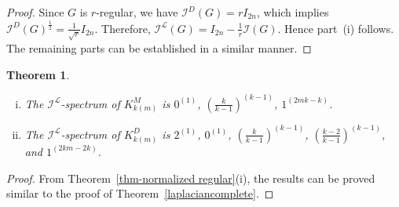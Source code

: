 \documentclass[12pt]{article}
\numberwithin{equation}{section}
\newtheorem{thm}{Theorem}[section]
\begin{document}
	\begin{proof}
		Since $G$ is $r$-regular, we have $\mathcal{I}^D(G)=rI_{2n}$, which implies $\mathcal{I}^D(G)^{\frac{1}{2}}=\displaystyle\frac{1}{\sqrt{r}}I_{2n}$. Therefore,  $\mathcal{I}^\mathcal{L}(G)=I_{2n}-\displaystyle\frac{1}{r}\mathcal{I}(G)$. Hence part~(i) follows. The remaining parts can be established in a similar manner.
	\end{proof}
	
	\begin{thm}\label{normalizedlaplaciancomplete}
		\begin{enumerate}[(i)]
			\item The $\mathcal{I}^\mathcal{L}$-spectrum of $K^M_{k(m)}$ is $0^{(1)}$, $(\frac{k}{k-1})^{(k-1)}$, $1^{(2mk-k)}$.
			
			\item The $\mathcal{I}^\mathcal{L}$-spectrum of $K^D_{k(m)}$ is $2^{(1)}$, $0^{(1)}$, $(\frac{k}{k-1})^{(k-1)}$, $(\frac{k-2}{k-1})^{(k-1)}$, and $1^{(2km-2k)}$.
		\end{enumerate}
	\end{thm}
	\begin{proof}
		From Theorem~\ref{thm-normalized regular}(i), the results can be proved similar to the proof of Theorem~\ref{laplaciancomplete}.
	\end{proof}
	
\end{document}

